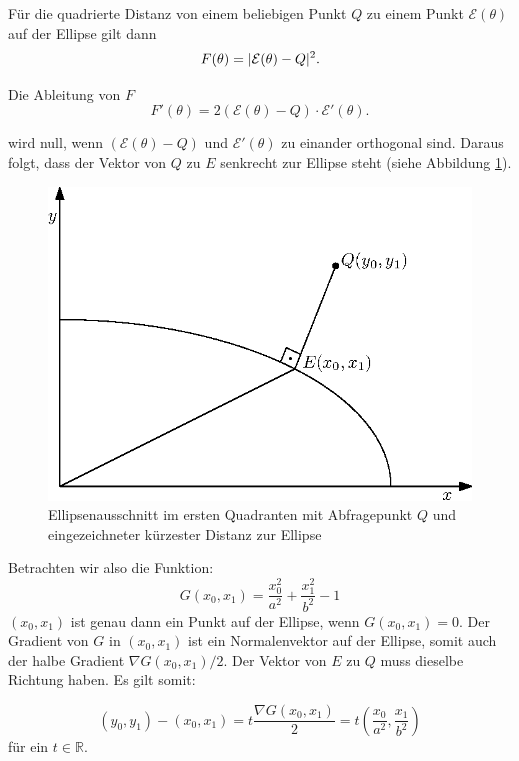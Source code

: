 Für die quadrierte Distanz von einem beliebigen Punkt $Q$ zu einem Punkt $\mathcal{E}(\theta)$ auf der Ellipse gilt dann
\begin{equation}
	F(\theta) = \lvert\mathcal{E}(\theta) - Q\rvert^2.
\end{equation}

Die Ableitung von $F$
\begin{equation}
F'(\theta) = 2\left(\mathcal{E}(\theta) - Q\right) \cdot \mathcal{E}'(\theta).
\end{equation}

wird null, wenn $\left(\mathcal{E}(\theta) - Q\right)$ und $ \mathcal{E}'(\theta)$ zu einander orthogonal sind. Daraus folgt, dass der Vektor von $Q$ zu $E$ senkrecht zur Ellipse steht (siehe Abbildung \ref{fig:ellipseDist}). 


\begin{figure}[!htb]
	\centering
	\includegraphics[scale=.9]{images/ellipseQuery.eps}
	\caption{Ellipsenausschnitt im ersten Quadranten mit Abfragepunkt $Q$ und eingezeichneter kürzester Distanz zur Ellipse}
	\label{fig:ellipseDist}
\end{figure}

Betrachten wir also die Funktion:
\[G(x_0,x_1) = \frac{x_0^2}{a^2} + \frac{x_1^2}{b^2} - 1\] 
$(x_0,x_1)$ ist genau dann ein Punkt auf der Ellipse, wenn $G(x_0,x_1) = 0$. Der Gradient von $G$ in $(x_0,x_1)$ ist ein Normalenvektor auf der Ellipse, somit auch der halbe Gradient $\nabla G(x_0,x_1)/2$. Der Vektor von $E$ zu $Q$ muss dieselbe Richtung haben. Es gilt somit:

\begin{equation}
	(y_0,y_1) - (x_0, x_1) = t\frac{\nabla G(x_0,x_1)}{2} = t\left(\frac{x_0}{a^2},\frac{x_1}{b^2}\right)
\end{equation}
für ein $t\in\mathbb{R}$.

